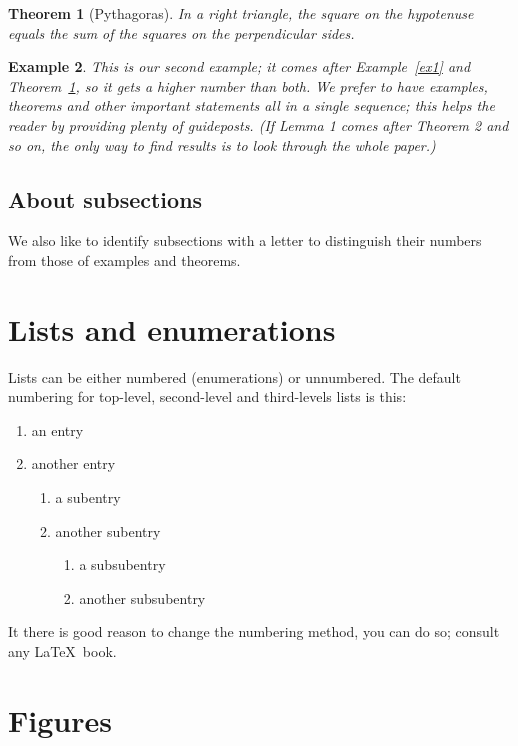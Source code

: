 \documentclass[11pt,reqno]{amsart}
\numberwithin{equation}{section}
\newtheorem{example}{Example}[section]  %
\newtheorem{theorem}[example]{Theorem}  %
\begin{document}
\begin{theorem}[Pythagoras]
\label{pyth}
In a right triangle,
the square on the hypotenuse equals the sum of the squares on the
perpendicular sides.
\end{theorem}

\begin{example}\rm 
This is our second example; it comes after
Example~\ref{ex1} and Theorem~\ref{pyth}, so it gets a higher number
than both.  We prefer to have examples, theorems and other
important statements all in a single sequence; this helps the reader
by providing plenty of guideposts.  (If Lemma 1 comes after Theorem
2 and so on, the only way to find results is to look through the whole paper.)
\end{example}

\subsection{About subsections}

We also like to identify subsections with a letter to distinguish
their numbers from those of examples and theorems.

\section{Lists and enumerations}

Lists can be either numbered (enumerations) or unnumbered.
The default numbering for top-level, second-level and third-levels
lists is this:
\begin{enumerate}
\item an entry 
\item another entry 
\begin{enumerate}
\item a subentry 
\item another subentry 
\begin{enumerate}
\item a subsubentry 
\item another subsubentry 
\end{enumerate}
\end{enumerate}
\end{enumerate}
It there is good reason to change the numbering method, you can do so;
consult any \LaTeX\ book.


\section{Figures}
\end{document}
